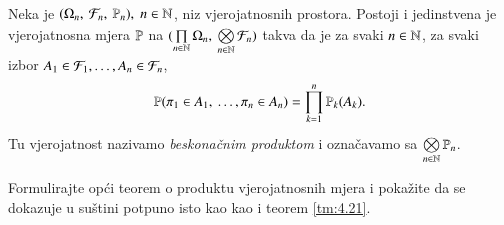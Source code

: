 \begin{tm}  \label{tm:4.21}
    Neka je $(\Omega_n, \: \mathcal{F}_n, \: \mathbb{P}_n), \; n \in \mathbb{N}$, niz vjerojatnosnih prostora.
    Postoji i jedinstvena je vjerojatnosna mjera $\mathbb{P}$ na $({\prod\limits_{n \in \mathbb{N}}^{} \Omega_n}, \: {\bigotimes\limits_{n \in \mathbb{N}}^{} \mathcal{F}_n})$ takva da je za svaki $n \in \mathbb{N}$, za svaki izbor $A_1 \in \mathcal{F}_1, \dots, A_n \in \mathcal{F}_n$,
    \begin{equation*}
        \mathbb{P}(\pi_1 \in A_1, \: \dots, \pi_n \in A_n)
        = \prod\limits_{k = 1}^{n} \mathbb{P}_k (A_k).
    \end{equation*}
    Tu vjerojatnost nazivamo \emph{beskona\v cnim produktom} i ozna\v cavamo sa $\bigotimes\limits_{n \in \mathbb{N}}^{} \mathbb{P}_n$.
\end{tm}

\begin{zad} \label{zad:4.22}
    Formulirajte op\' ci teorem o produktu vjerojatnosnih mjera i poka\v zite da se dokazuje u su\v stini potpuno isto kao kao i teorem \ref{tm:4.21}.
\end{zad}